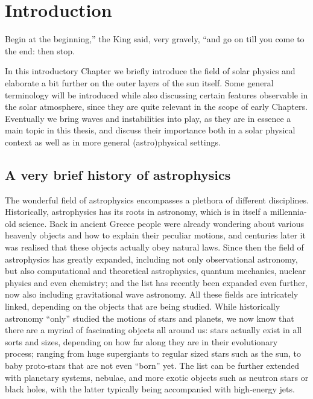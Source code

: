 \chapter{Introduction} \label{ch: introduction}

\graphicspath{{01-introduction/figures/}}

\begin{chapterquote}
  Begin at the beginning,'' the King said, very gravely,
  ``and go on till you come to the end: then stop.
\end{chapterquote}

In this introductory Chapter we briefly introduce the field of solar physics and elaborate a bit further on the outer layers of the sun itself. Some general terminology will be introduced while also discussing certain features observable in the solar atmosphere, since they are quite relevant in the scope of early Chapters. Eventually we bring waves and instabilities into play, as they are in essence a main topic in this thesis, and discuss their importance both in a solar physical context as well as in more general (astro)physical settings.

\section{A very brief history of astrophysics}
The wonderful field of astrophysics encompasses a plethora of different disciplines. Historically, astrophysics has its roots in astronomy, which is in itself a millennia-old science. Back in ancient Greece people were already wondering about various heavenly objects and how to explain their peculiar motions, and centuries later it was realised that these objects actually obey natural laws. Since then the field of astrophysics has greatly expanded, including not only observational astronomy, but also computational and theoretical astrophysics, quantum mechanics, nuclear physics and even chemistry; and the list has recently been expanded even further, now also including gravitational wave astronomy. All these fields are intricately linked, depending on the objects that are being studied. While historically astronomy ``only'' studied the motions of stars and planets, we now know that there are a myriad of fascinating objects all around us: stars actually exist in all sorts and sizes, depending on how far along they are in their evolutionary process; ranging from huge supergiants to regular sized stars such as the sun, to baby proto-stars that are not even ``born'' yet. The list can be further extended with planetary systems, nebulae, and more exotic objects such as neutron stars or black holes, with the latter typically being accompanied with high-energy jets.

